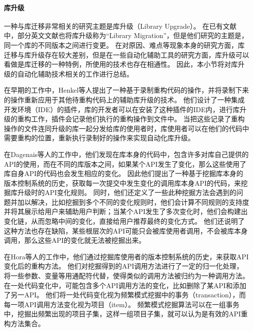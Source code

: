\documentclass[UTF8]{ctexart}
\begin{document}
\paragraph{库升级}


一种与库迁移非常相关的研究主题是库升级（Library Upgrade）。
在已有文献中，部分英文文献也将库升级称为“Library Migration”，但是他们研究的主题是，同一个库的不同版本之间进行变更。
在对原因、难点等现象本身的研究方面，库迁移与库升级存在较大差别，但是在一些自动化辅助工具的研究方面，库升级可以看做是库迁移的一种特例，所使用的技术也存在相通性。
因此，本小节将对库升级的自动化辅助技术相关的工作进行总结。

在早期的工作中，Henkel等人\cite{2005ICSE-Henkel-CatchUp}提出了一种基于录制重构代码的操作，并将录制下来的操作重新应用于其他待重构代码上的辅助库升级的技术。
他们设计了一种集成开发环境（IDE）的插件，库的开发者可以在安装了这种插件的IDE内，进行库升级的重构工作，插件会记录他们执行的重构操作到文件中。
当把这些记录了重构操作的文件连同升级的库一起分发给库的使用者时，库使用者可以在他们的代码中需要重构的位置，重新执行录制好的操作来实现自动化库升级。

在Dagenais等人\cite{2008ICSE-Dagenais-Recommending}的工作中，他们发现在库本身的代码中，包含许多对库自己提供的API的使用，而在不同的库版本之间，如果某个API发生了变化，那么这些使用了库自身API的代码也会发生相应的变化。
因此他们提出了一种基于挖掘库本身的版本控制系统的历史，获取每一次提交中发生变化的调用库本身API的代码，来挖掘库升级时的API变化规则。
同时，他们还定义了一些此种挖掘方法会遇到的问题并加以解决，比如挖掘到多个不同的变化规则时，他们会计算不同规则的支持度并将其展示给用户来辅助用户判断；当某个API发生了多次变化时，他们会构建出变化链，从而忽略中间的变化，直接给用户推荐最终的变化方式。
他们还说明了这种方法也存在缺陷，某些根层次的API可能只会被库使用者调用，不会被库本身调用，那么这些API的变化就无法被挖掘出来。

在Hora等人\cite{2014WCRE-Hora-APIEvolutionMiner}的工作中，他们通过挖掘库使用者的版本控制系统的历史，来获取API变化后的重构方法。
他们对挖掘得到的API调用方法进行了一定的归一化处理，将一些参数、变量等用通配符代替，使得类似的调用方法被归约为一种调用方法。
在一处代码变化中，可能包含多个API调用方法的变化，比如删除了某API和添加了另一API。
他们将一处代码变化视为频繁模式挖掘中的事务（transaction），而每一项API调用方法变化视为项目（item）。
频繁模式挖掘算法可以在一组事务中，挖掘出频繁出现的项目子集，这样一组项目子集，就可以认为是有效的API重构方法集合。
\end{document}
